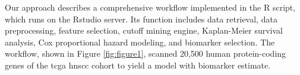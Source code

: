 \documentclass[jpm,article,submit,moreauthors,pdftex]{Definitions/mdpi}
\begin{document}
Our approach describes a comprehensive workflow implemented in the R script, which runs on the Rstudio server.
Its function includes data retrieval, data preprocessing, feature selection, cutoff mining engine, Kaplan-Meier survival analysis, Cox proportional hazard modeling, and biomarker selection.
The workflow, shown in Figure \ref{fig:figure1}, scanned 20,500 human protein-coding genes of the \acrshort{tcga} \acrshort{hnscc} cohort to yield a model with biomarker estimate.

\end{document}
